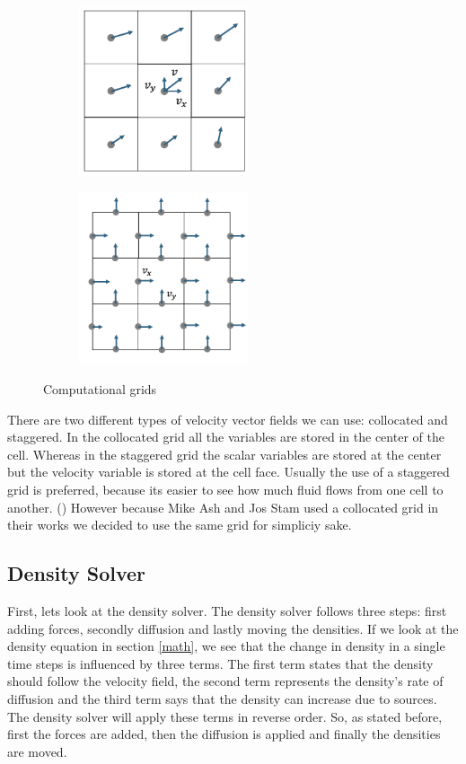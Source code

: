 \documentclass[a4paper,12pt,titlepage]{article}
\begin{document}
\begin{figure}[H]
	\centering
	\begin{subfigure}[t]{0.45\textwidth}
		\centering
		\includegraphics[width=5cm]{resources/collocated_grid_2.png}
	\end{subfigure}
	\hfill
	\begin{subfigure}[t]{0.45\textwidth}
		\centering
		\includegraphics[width=5cm]{resources/staggered_grid_2.png}
	\end{subfigure}
	\caption{Computational grids}
\end{figure}

There are two different types of velocity vector fields we can use: collocated and staggered.
In the collocated grid all the variables are stored in the center of the cell. 
Whereas in the staggered grid the scalar variables are stored at the center but the velocity variable is stored at the cell face. 
Usually the use of a staggered grid is preferred, because its easier to see how much fluid flows from one cell to another. (\cite{tenminute})
However because Mike Ash and Jos Stam used a collocated grid in their works we decided to use the same grid for simpliciy sake.

\subsection{Density Solver} \label{density}

First, lets look at the density solver. The density solver follows three steps: first adding forces, secondly diffusion and lastly moving the densities. 
If we look at the density equation in section \ref{math}, we see that the change in density in a single time steps is influenced by three terms. 
The first term states that the density should follow the velocity field,
the second term represents the density's rate of diffusion
and the third term says that the density can increase due to sources. 
The density solver will apply these terms in reverse order. 
So, as stated before, first the forces are added, then the diffusion is applied and finally the densities are moved.
\end{document}
